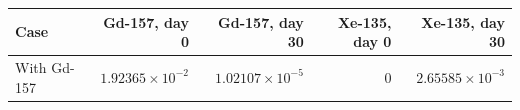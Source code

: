 \begin{center}\small
\begin{tabular}{lrrrr}
\toprule
Case & Gd-157, day 0 & Gd-157, day 30 & Xe-135, day 0 & Xe-135, day 30 \\
\midrule
With Gd-157 & $1.92365\times10^{-2}$ & $1.02107\times10^{-5}$ & 0 & $2.65585\times10^{-3}$ \\
\bottomrule
\end{tabular}
\end{center}
